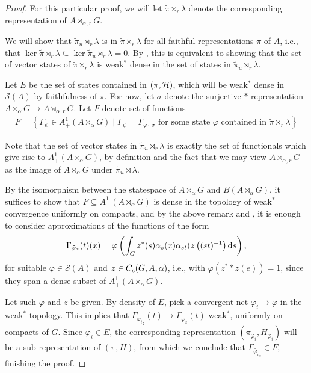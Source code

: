 \begin{proof}
For this particular proof, we will let $\tilde \pi \rtimes_r \lambda$ denote the corresponding representation of $A \rtimes_{\alpha,r}G$.

We will show that $\tilde \pi_u \rtimes_r \lambda$ is  in $\tilde \pi \rtimes_r \lambda$ for all faithful representations $\pi$ of $A$, i.e., that $\ker \tilde \pi \rtimes_r \lambda \subseteq \ker\tilde \pi_u \rtimes_r \lambda = 0$. By \cite[80]{dixmier1969c}, this is equivalent to showing that the set of vector states of $\tilde \pi \rtimes_r \lambda$ is weak$^*$ dense in the set of states in $\tilde \pi_u \rtimes_r \lambda$.

Let $E$ be the set of states contained in $(\pi,\mathcal{H})$, which will be weak$^*$ dense in $\mathcal{S}(A)$ by faithfulness of $\pi$. For now, let $\sigma$ denote the surjective $*$-representation $A \rtimes_\alpha G \to A \rtimes_{\alpha,r}G$. Let $F$ denote set of functions
\begin{align*}
	F = \left\{  \Gamma_\psi \in A_+^1(A\rtimes_\alpha G) \mid \Gamma_\psi = \Gamma_{\varphi \circ \sigma} \text{ for some state } \varphi \text{ contained in } \tilde \pi \rtimes_r \lambda \right\}
\end{align*}

Note that the set of vector states in $\tilde \pi_u \rtimes_r \lambda$ is exactly the set of functionals which give rise to $A_+^1(A \rtimes_\alpha G)$, by definition and the fact that we may view $A \rtimes_{\alpha,r} G$ as the image of $A \rtimes_\alpha G$ under $\tilde \pi_u \rtimes \lambda$.

By the isomorphism between the statespace of $A \rtimes_\alpha G$ and $B(A \rtimes_\alpha G)$, it suffices to show that $F \subseteq A_+^1(A \rtimes_\alpha G)$ is dense in the topology of weak$^*$ convergence uniformly on compacts, and by the above remark and , it is enough to consider approximations of the functions of the form
\begin{align*}
	\Gamma_{\tilde \varphi_z}(t) (x) =\varphi\left( \int_G z^*(s) \alpha_s(x) \alpha_{st}(z\left( (st)^{-1} \right)\mathrm{d} s \right),
\end{align*}
for suitable $\varphi \in \mathcal{S}(A)$ and $z \in C_c(G,A,\alpha)$, i.e., with $\varphi(z^* \ast z(e)) = 1$, since they span a dense subset of $A_+^1(A \rtimes_\alpha G)$.

Let such $\varphi$ and $z$ be given. By density of $E$, pick a convergent net $\varphi_i \to \varphi$ in the weak$^*$-topology. This implies that $\Gamma_{\tilde {\varphi_i}_z}(t) \to \Gamma_{\tilde \varphi_z}(t)$ weak$^*$, uniformly on compacts of $G$. Since $\varphi_i \in E$, the corresponding representation $(\pi_{\varphi_i},H_{\varphi_i})$ will be a sub-representation of $(\pi,H)$, from which we conclude that $\Gamma_{\tilde {\varphi_i}_z} \in F$, finishing the proof.
\end{proof}
